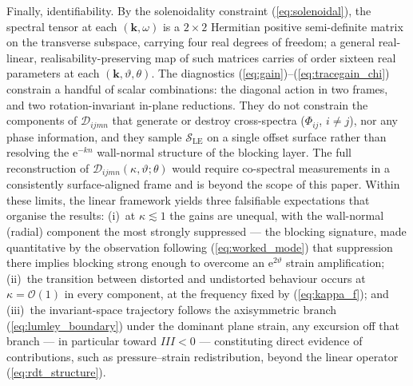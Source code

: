 \documentclass[lineno]{JFM-FLM_Au}
\newcommand{\tbd}[1]{\textcolor{red}{\ensuremath{\langle\mbox{\small #1}\rangle}}}
\begin{document}
Finally, identifiability. By the solenoidality constraint
(\ref{eq:solenoidal}), the spectral tensor at each
$(\boldsymbol{k},\omega)$ is a $2\times2$ Hermitian positive
semi-definite matrix on the transverse subspace, carrying four real
degrees of freedom; a general real-linear, realisability-preserving map of
such matrices carries of order sixteen real parameters at each
$(\boldsymbol{k},\vartheta,\theta)$. The diagnostics
(\ref{eq:gain})--(\ref{eq:tracegain_chi}) constrain a handful of scalar
combinations: the diagonal action in two frames, and two
rotation-invariant in-plane reductions. They do not constrain the
components of $\mathcal{D}_{ijmn}$ that generate or destroy cross-spectra
($\Phi_{ij}$, $i\ne j$), nor any phase information, and they sample
$\mathcal{S}_{\mathrm{LE}}$ on a single offset surface rather than
resolving the $\mathrm{e}^{-kn}$ wall-normal structure of the blocking
layer. The full reconstruction of
$\mathcal{D}_{ijmn}(\kappa,\vartheta;\theta)$ would require co-spectral
measurements in a consistently surface-aligned frame and is beyond the
scope of this paper. Within these limits, the linear framework yields
three falsifiable expectations that organise the results:
(i)~at $\kappa \lesssim 1$ the gains are unequal, with the wall-normal
(radial) component the most strongly suppressed --- the blocking
signature, made quantitative by the observation following
(\ref{eq:worked_mode}) that suppression there implies blocking strong
enough to overcome an $\mathrm{e}^{2\vartheta}$ strain amplification;
(ii)~the transition between distorted and undistorted behaviour occurs at
$\kappa = \mathcal{O}(1)$ in every component, at the frequency fixed by
(\ref{eq:kappa_f}); and
(iii)~the invariant-space trajectory follows the axisymmetric branch
(\ref{eq:lumley_boundary}) under the dominant plane strain, any excursion
off that branch --- in particular toward $III<0$ --- constituting direct
evidence of contributions, such as pressure--strain redistribution, beyond
the linear operator (\ref{eq:rdt_structure}).

%
%
\end{document}
